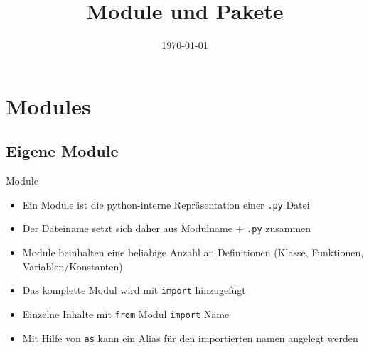 

\usepackage{comment}

\newcommand{\topic}{
	Module und Pakete
}

\title{\topic}
\supertitle{\course}
\date{\today}



\maketitle

\begin{frame}
	\tableofcontents
\end{frame}


\section{Modules}
\subsection{Eigene Module}
\begin{frame}[fragile]{Module}
	\begin{itemize}
		\item Ein Module ist die python-interne Repräsentation einer \texttt{.py} Datei
		\item Der Dateiname setzt sich daher aus Modulname + \texttt{.py} zusammen
		\item Module beinhalten eine beliabige Anzahl an Definitionen (Klasse, Funktionen, Variablen/Konstanten)
		\item Das komplette Modul wird mit \texttt{import} hinzugefügt
		\item Einzelne Inhalte mit \texttt{from} Modul \texttt{import} Name
		\item Mit Hilfe von \texttt{as} kann ein Alias für den importierten namen angelegt werden
	\end{itemize}

\end{frame}

